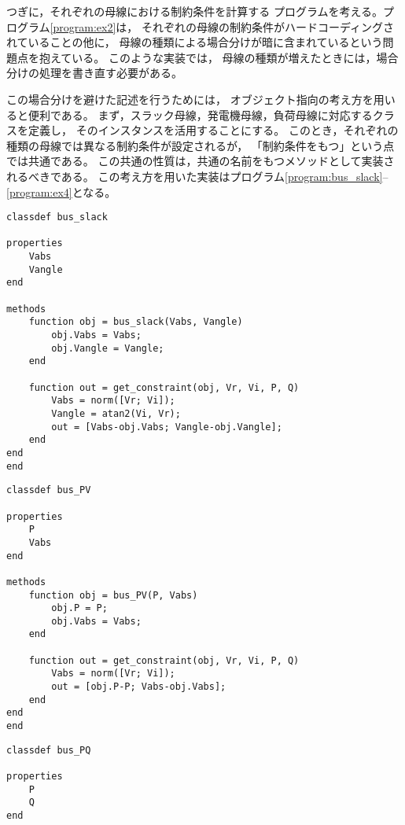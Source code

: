 {\begin{例}[より良い実装]
つぎに，それぞれの母線における制約条件を計算する
プログラムを考える。プログラム\ref{program:ex2}は，
それぞれの母線の制約条件がハードコーディングされていることの他に，
母線の種類による場合分けが暗に含まれているという問題点を抱えている。
このような実装では，
母線の種類が増えたときには，場合分けの処理を書き直す必要がある。

この場合分けを避けた記述を行うためには，
オブジェクト指向の考え方を用いると便利である。
まず，スラック母線，発電機母線，負荷母線に対応するクラスを定義し，
そのインスタンスを活用することにする。
このとき，それぞれの種類の母線では異なる制約条件が設定されるが，
「制約条件をもつ」という点では共通である。
この共通の性質は，共通の名前をもつメソッドとして実装されるべきである。
この考え方を用いた実装はプログラム\ref{program:bus_slack}--\ref{program:ex4}となる。

\begin{PROGRAMA}[count,title={bus\_slack.m}]\label{program:bus_slack}
\begin{verbatim}
classdef bus_slack

properties
    Vabs
    Vangle
end

methods
    function obj = bus_slack(Vabs, Vangle)
        obj.Vabs = Vabs;
        obj.Vangle = Vangle;
    end
    
    function out = get_constraint(obj, Vr, Vi, P, Q)
        Vabs = norm([Vr; Vi]);
        Vangle = atan2(Vi, Vr);
        out = [Vabs-obj.Vabs; Vangle-obj.Vangle];
    end
end
end
\end{verbatim}
\end{PROGRAMA}

\begin{PROGRAMA}[count,title={bus\_PV.m}]\label{program:bus_PV}
\begin{verbatim}
classdef bus_PV

properties
    P
    Vabs
end

methods
    function obj = bus_PV(P, Vabs)
        obj.P = P;
        obj.Vabs = Vabs;
    end
    
    function out = get_constraint(obj, Vr, Vi, P, Q)
        Vabs = norm([Vr; Vi]);
        out = [obj.P-P; Vabs-obj.Vabs];
    end
end
end
\end{verbatim}
\end{PROGRAMA}

\begin{PROGRAMA}[count,title={bus\_PQ.m}]\label{program:bus_PQ}
\begin{verbatim}
classdef bus_PQ

properties
    P
    Q
end


\end{verbatim}
\end{PROGRAMA}
\end{例}}
